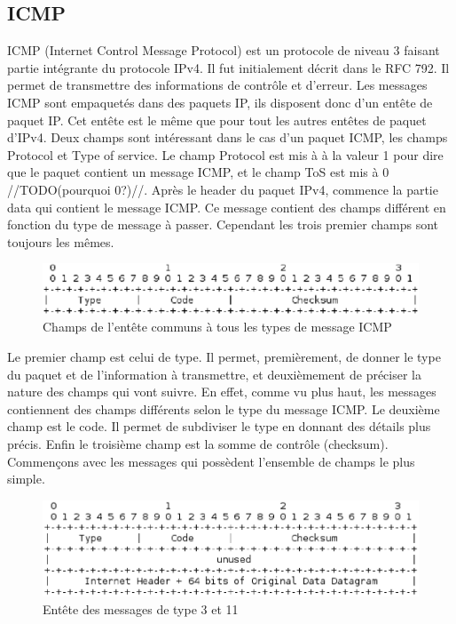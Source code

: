 
\subsection{ICMP} ICMP (Internet Control Message Protocol) est un protocole de
niveau 3 faisant partie intégrante du protocole IPv4. Il fut initialement
décrit dans le RFC 792\cite{url-RFC-ICMP}.
Il permet de transmettre des informations de contrôle et d'erreur. Les messages
ICMP sont empaquetés dans des paquets IP, ils disposent donc d'un entête de
paquet IP. Cet entête est le même que pour tout les autres entêtes de paquet
d'IPv4. Deux champs sont intéressant dans le cas d'un paquet ICMP, les champs
Protocol et Type of service. Le champ Protocol est mis à à la valeur 1 pour
dire que le paquet contient un message ICMP, et le champ ToS est mis à 0
//TODO(pourquoi 0?)//.  Après le header du paquet IPv4, commence la partie data
qui contient le message ICMP. Ce message contient des champs différent en
fonction du type de message à passer. Cependant les trois premier champs sont
toujours les mêmes.


\begin{figure}[h]
\centering
\includegraphics[width=12cm]{./pics/header.eps}
\caption{Champs de l'entête communs à tous les types de message ICMP}
\label{fig:headicmp}
\end{figure}

Le premier champ est celui de type. Il permet, premièrement, de donner le type
du paquet et de l'information à transmettre, et deuxièmement de préciser la
nature des champs qui vont suivre. En effet, comme vu plus haut, les messages
contiennent des champs différents selon le type du message ICMP.  Le deuxième
champ est le code. Il permet de subdiviser le type en donnant des détails plus
précis. Enfin le troisième champ est la somme de contrôle (checksum).
Commençons avec les messages qui possèdent l'ensemble de champs le plus simple.

\begin{figure}[h]
\centering
\includegraphics[width=12cm]{./pics/header1.eps}
\caption{Entête des messages de type 3 et 11}
\label{fig:head1icmp}
\end{figure}

